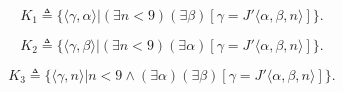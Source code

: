 $$K_1 \triangleq \{ \langle \gamma, \alpha \rangle | (\exists n < 9)(\exists \beta)[\gamma = J' \langle \alpha, \beta, n \rangle] \}.$$

$$K_2 \triangleq \{ \langle \gamma, \beta \rangle | (\exists n < 9)(\exists \alpha)[\gamma = J' \langle \alpha, \beta, n \rangle] \}.$$

$$K_3 \triangleq \{ \langle \gamma, n \rangle | n < 9 \wedge (\exists \alpha)(\exists \beta)[\gamma = J' \langle \alpha, \beta, n \rangle] \}.$$
